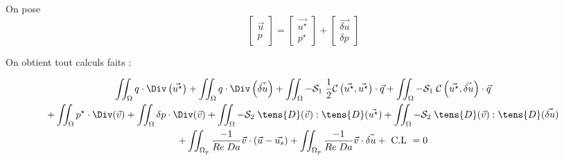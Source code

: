 \documentclass[article,11pt,a4paper,nomtoc]{LaRouviereClasse}
\begin{document}
On pose
\begin{equation}
	\begin{bmatrix}
	\vec{u} \\ 
	p
	\end{bmatrix}
	=	\begin{bmatrix}
	\vec{u^\star} \\ 
	p^\star
	\end{bmatrix} + \begin{bmatrix}
	\vec{\delta u} \\ 
	\delta p
	\end{bmatrix}
\end{equation}

On obtient tout calculs faits :

\begin{multline}
	\iint_{\Omega}{q\cdot\Div\left(\vec{u^\star}\right)} + \iint_{\Omega}{q\cdot\Div\left(\vec{\delta u}\right)} + \iint_{\Omega}{-\mathcal{S}_1\;\dfrac{1}{2}\mathcal{C}\left(\vec{u^\star},\vec{u^\star}\right)\cdot\vec{q}} + \iint_{\Omega}{-\mathcal{S}_1\;\mathcal{C}\left(\vec{u^\star},\vec{\delta u}\right)\cdot\vec{q}} \\ + \iint_{\Omega}{p^\star\cdot\Div(\vec{v})} + \iint_{\Omega}{\delta p\cdot\Div(\vec{v})} + \iint_{\Omega}{-\mathcal{S}_2\;\tens{D}(\vec{v}):\tens{D}(\vec{u^\star})} + \iint_{\Omega}{-\mathcal{S}_2\;\tens{D}(\vec{v}):\tens{D}(\vec{\delta u})} \\ + \iint_{\Omega_p}{\dfrac{-1}{Re\;Da}\vec{v}\cdot\left(\vec{u}-\vec{u_s}\right)} + \iint_{\Omega_p}{\dfrac{-1}{Re\;Da}\vec{v}\cdot\vec{\delta u}} + \text{ C.L } = 0
\end{multline}

\end{document}
